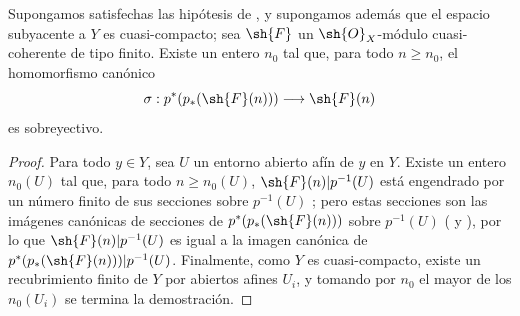 \documentclass[oneside,10pt]{amsart}
\makeatletter
\renewcommand{\geq}{\geqslant}
\newcommand{\ega@arrow}[2]{\mathchoice{#1}{#2}{#2}{#2}}
\renewcommand{\to}{\ega@arrow{\longrightarrow}{\rightarrow}}
\let\EGAOriginalLabel\label
\renewcommand{\label}[1]{\phantomsection\EGAOriginalLabel{#1}}
\makeatother
\begin{document}
\begin{corollary}[3.4.6]
\label{II.3.4.6}
Supongamos satisfechas las hipótesis de , y supongamos además que el espacio subyacente a $Y$ es cuasi-compacto; sea $\sh{F}$ un $\sh{O}_X$-módulo cuasi-coherente de tipo finito.
Existe un entero $n_0$ tal que, para todo $n\geq n_0$, el homomorfismo canónico
\[
  \sigma:p^*(p_*(\sh{F}(n)))\to\sh{F}(n)
\]
 es sobreyectivo.
\end{corollary}

\begin{proof}
Para todo $y\in Y$, sea $U$ un entorno abierto afín de $y$ en $Y$.
Existe un entero $n_0(U)$ tal que, para todo $n\geq n_0(U)$, $\sh{F}(n)|p^{-1}(U)$ está engendrado por un número finito de sus secciones sobre $p^{-1}(U)$ ; pero estas secciones son las imágenes canónicas de secciones de $p^*(p_*(\sh{F}(n)))$ sobre $p^{-1}(U)$ ( y ), por lo que $\sh{F}(n)|p^{-1}(U)$ es igual a la imagen canónica de $p^*(p_*(\sh{F}(n)))|p^{-1}(U)$.
Finalmente, como $Y$ es cuasi-compacto, existe un recubrimiento finito de $Y$ por abiertos afines $U_i$, y tomando por $n_0$ el mayor de los $n_0(U_i)$ se termina la demostración.
\end{proof}
\end{document}
